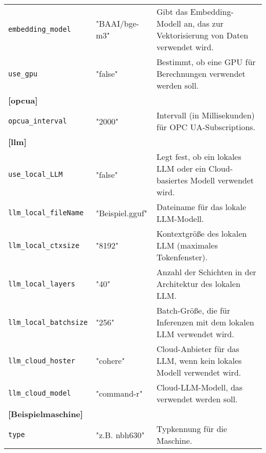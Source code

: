 \documentclass[%
	paper=a4,           %
	12pt,               %
	parskip=full,       %
	oneside,            %
	listof=totoc,		%
	bibliography=totoc,
	toc=listof,
	toc=chapterentrydotfill %
]{scrreprt}             %
\begin{document}
\begin{table}[H]
\begin{tabular}{p{3.5cm}p{2.5cm}p{10.5cm}}
        \texttt{embedding\_model}        & "BAAI/bge-m3"         & Gibt das Embedding-Modell an, das zur Vektorisierung von Daten verwendet wird.      \\
        \texttt{use\_gpu}                & "false"               & Bestimmt, ob eine GPU für Berechnungen verwendet werden soll.                       \\
        \midrule
        \multicolumn{3}{l}{\textbf{[opcua]}}                                                                                                           \\
        \texttt{opcua\_interval}         & "2000"                & Intervall (in Millisekunden) für OPC UA-Subscriptions.                              \\
        \midrule
        \multicolumn{3}{l}{\textbf{[llm]}}                                                                                                             \\
        \texttt{use\_local\_LLM}         & "false"               & Legt fest, ob ein lokales LLM oder ein Cloud-basiertes Modell verwendet wird.       \\
        \texttt{llm\_local\_fileName}    & "Beispiel.gguf"       & Dateiname für das lokale LLM-Modell.                                                \\
        \texttt{llm\_local\_ctxsize}     & "8192"                & Kontextgröße des lokalen LLM (maximales Tokenfenster).                              \\
        \texttt{llm\_local\_layers}      & "40"                  & Anzahl der Schichten in der Architektur des lokalen LLM.                            \\
        \texttt{llm\_local\_batchsize}   & "256"                 & Batch-Größe, die für Inferenzen mit dem lokalen LLM verwendet wird.                 \\
        \texttt{llm\_cloud\_hoster}      & "cohere"              & Cloud-Anbieter für das LLM, wenn kein lokales Modell verwendet wird.                \\
        \texttt{llm\_cloud\_model}       & "command-r"           & Cloud-LLM-Modell, das verwendet werden soll.                                        \\
        \midrule
        \multicolumn{3}{l}{\textbf{[Beispielmaschine]}} (Parameter müssen ermittelt werden)                                                            \\
        \texttt{type}                    & "z.B. nbh630"         & Typkennung für die Maschine.                                                        \\

\end{tabular}
\end{table}
\end{document}
